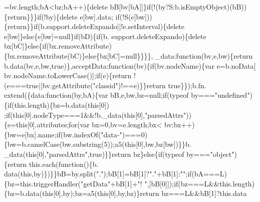 \begin{DoxyCode}
      =bv.length;bA<bz;bA++)\{\textcolor{keyword}{delete} bB[bv[bA]]\}\textcolor{keywordflow}{if}(!(by?S:b.isEmptyObject)(bB))\{\textcolor{keywordflow}{return}\}\}\}\textcolor{keywordflow}{if}(!by)\{\textcolor{keyword}{delete} e[bw].data;\textcolor{keywordflow}{
      if}(!S(e[bw]))\{\textcolor{keywordflow}{return}\}\}\textcolor{keywordflow}{if}(b.support.deleteExpando||!e.setInterval)\{\textcolor{keyword}{delete} e[bw]\}\textcolor{keywordflow}{else}\{e[bw]=null\}\textcolor{keywordflow}{if}(bD)\{\textcolor{keywordflow}{if}(b.
      support.deleteExpando)\{\textcolor{keyword}{delete} bx[bC]\}\textcolor{keywordflow}{else}\{\textcolor{keywordflow}{if}(bx.removeAttribute)\{bx.removeAttribute(bC)\}\textcolor{keywordflow}{else}\{bx[bC]=null\}\}\}\},
      \_data:\textcolor{keyword}{function}(bv,e,bw)\{\textcolor{keywordflow}{return} b.data(bv,e,bw,\textcolor{keyword}{true})\},acceptData:\textcolor{keyword}{function}(bv)\{\textcolor{keywordflow}{if}(bv.nodeName)\{var e=b.noData[
      bv.nodeName.toLowerCase()];\textcolor{keywordflow}{if}(e)\{\textcolor{keywordflow}{return} !(e===\textcolor{keyword}{true}||bv.getAttribute(\textcolor{stringliteral}{"classid"})!==e)\}\}\textcolor{keywordflow}{return} \textcolor{keyword}{true}\}\});b.fn.
      extend(\{data:\textcolor{keyword}{function}(by,bA)\{var bB,e,bw,bz=null;\textcolor{keywordflow}{if}(typeof by===\textcolor{stringliteral}{"undefined"})\{\textcolor{keywordflow}{if}(this.length)\{bz=b.data(\textcolor{keyword}{this}[0])
      ;\textcolor{keywordflow}{if}(\textcolor{keyword}{this}[0].nodeType===1&&!b.\_data(\textcolor{keyword}{this}[0],\textcolor{stringliteral}{"parsedAttrs"}))\{e=\textcolor{keyword}{this}[0].attributes;\textcolor{keywordflow}{for}(var bx=0,bv=e.length;bx<
      bv;bx++)\{bw=e[bx].name;\textcolor{keywordflow}{if}(bw.indexOf(\textcolor{stringliteral}{"data-"})===0)\{bw=b.camelCase(bw.substring(5));a5(\textcolor{keyword}{this}[0],bw,bz[bw])\}\}b.
      \_data(\textcolor{keyword}{this}[0],\textcolor{stringliteral}{"parsedAttrs"},\textcolor{keyword}{true})\}\}\textcolor{keywordflow}{return} bz\}\textcolor{keywordflow}{else}\{\textcolor{keywordflow}{if}(typeof by===\textcolor{stringliteral}{"object"})\{\textcolor{keywordflow}{return} this.each(\textcolor{keyword}{function}()\{b.
      data(\textcolor{keyword}{this},by)\})\}\}bB=by.split(\textcolor{stringliteral}{"."});bB[1]=bB[1]?\textcolor{stringliteral}{"."}+bB[1]:\textcolor{stringliteral}{""};\textcolor{keywordflow}{if}(bA===L)\{bz=this.triggerHandler(\textcolor{stringliteral}{"getData"}+bB[1]+\textcolor{stringliteral}{"!
      "},[bB[0]]);\textcolor{keywordflow}{if}(bz===L&&this.length)\{bz=b.data(\textcolor{keyword}{this}[0],by);bz=a5(\textcolor{keyword}{this}[0],by,bz)\}\textcolor{keywordflow}{return} bz===L&&bB[1]?this.data

\end{DoxyCode}
